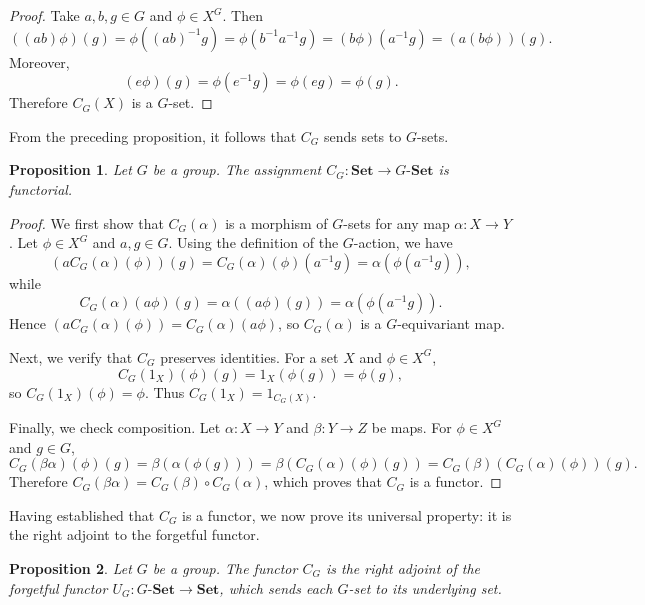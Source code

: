 \documentclass[10pt,a4paper]{amsart}
\newtheorem{proposition}{Proposition}
\begin{document}
\begin{proof}
Take $a, b, g \in G$ and $\phi \in X^G$. Then
\[
((ab)\phi)(g) = \phi((ab)^{-1}g) = \phi(b^{-1}a^{-1}g) = (b\phi)(a^{-1}g) = (a(b\phi))(g).
\]
Moreover,
\[
(e\phi)(g) = \phi(e^{-1}g) = \phi(eg) = \phi(g).
\]
Therefore $C_G(X)$ is a $G$-set.
\end{proof}

From the preceding proposition, it follows that $C_G$ sends sets to $G$-sets.

\begin{proposition}\label{prop:cofree_functor}
Let $G$ be a group. The assignment $C_G \colon \mathbf{Set} \longrightarrow G\text{-}\mathbf{Set}$ is functorial.
\end{proposition}

\begin{proof}
We first show that $C_G(\alpha)$ is a morphism of $G$-sets for any map $\alpha \colon X \rightarrow Y$. Let $\phi \in X^G$ and $a, g \in G$. Using the definition of the $G$-action, we have
\[
(a C_G(\alpha)(\phi))(g) = C_G(\alpha)(\phi)(a^{-1}g) = \alpha(\phi(a^{-1}g)),
\]
while
\[
C_G(\alpha)(a \phi)(g) = \alpha((a \phi)(g)) = \alpha(\phi(a^{-1}g)).
\]
Hence $(a C_G(\alpha)(\phi)) = C_G(\alpha)(a \phi)$, so $C_G(\alpha)$ is a $G$-equivariant map.

Next, we verify that $C_G$ preserves identities. For a set $X$ and $\phi \in X^G$,
\[
C_G(1_X)(\phi)(g) = 1_X(\phi(g)) = \phi(g),
\]
so $C_G(1_X)(\phi) = \phi$. Thus $C_G(1_X) = 1_{C_G(X)}$.

Finally, we check composition. Let $\alpha \colon X \rightarrow Y$ and $\beta \colon Y \rightarrow Z$ be maps. For $\phi \in X^G$ and $g \in G$,
\[
C_G(\beta\alpha)(\phi)(g) = \beta(\alpha(\phi(g))) = \beta(C_G(\alpha)(\phi)(g)) = C_G(\beta)(C_G(\alpha)(\phi))(g).
\]
Therefore $C_G(\beta\alpha) = C_G(\beta) \circ C_G(\alpha)$, which proves that $C_G$ is a functor.
\end{proof}

Having established that $C_G$ is a functor, we now prove its universal property: it is the right adjoint to the forgetful functor.

\begin{proposition}\label{prop:cofree_adjoint}
Let $G$ be a group. The functor $C_G$ is the right adjoint of the forgetful functor 
$U_G \colon G\text{-}\mathbf{Set} \longrightarrow \mathbf{Set}$, which sends each $G$-set to its underlying set.
\end{proposition}
\end{document}
